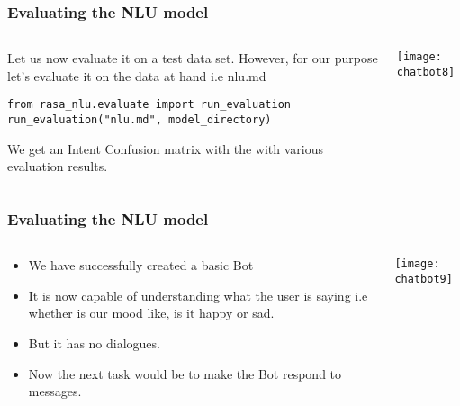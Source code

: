  \begin{frame}[fragile]\frametitle{Evaluating the NLU model}
 
    \begin{columns}
    \begin{column}[t]{0.5\linewidth}
Let us now evaluate it on a test data set. However, for our purpose let’s evaluate it on the data at hand i.e nlu.md
\begin{lstlisting}
from rasa_nlu.evaluate import run_evaluation
run_evaluation("nlu.md", model_directory)
\end{lstlisting}

We get an Intent Confusion matrix with the with various evaluation results.
    \end{column}
    \begin{column}[t]{0.5\linewidth}
\begin{center}
\texttt{[image: chatbot8]}
\end{center}
    \end{column}
  \end{columns}
\end{frame}

 \begin{frame}[fragile]\frametitle{Evaluating the NLU model}
 
    \begin{columns}
    \begin{column}[t]{0.5\linewidth}
\begin{itemize}
\item We have successfully created a basic Bot
\item It is now capable of understanding what the user is saying i.e whether is our mood like, is it happy or sad. 
\item But it has no dialogues. 
\item Now the next task would be to make the Bot respond to messages.
\end{itemize}
    \end{column}
    \begin{column}[t]{0.5\linewidth}
\begin{center}
\texttt{[image: chatbot9]}
\end{center}
    \end{column}
  \end{columns}
\end{frame}

